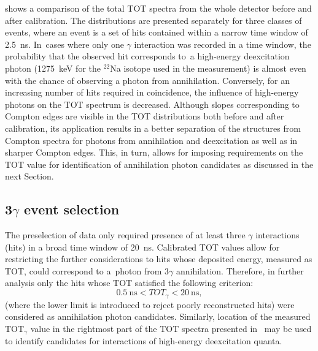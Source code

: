  shows a comparison of the total TOT spectra from the whole detector before and after calibration. The distributions are presented separately for three classes of events, where an event is a set of hits contained within a narrow time window of 2.5~ns. In~cases where only one $\gamma$ interaction was recorded in a time window, the probability that the observed hit corresponds to~a high-energy deexcitation photon (1275~keV for the $^{22}$Na isotope used in the measurement) is almost even with the chance of observing a photon from annihilation. Conversely, for an increasing number of hits required in coincidence, the influence of high-energy photons on the TOT spectrum is decreased. Although slopes corresponding to Compton edges are visible in the TOT distributions both before and after calibration, its application results in a better separation of the structures from Compton spectra for photons from annihilation and deexcitation as well as in sharper Compton edges. This, in turn, allows for imposing requirements on the TOT value for identification of annihilation photon candidates as discussed in the next Section.

\subsection{3$\gamma$ event selection}\label{sec:3g_selection}
The preselection of data only required presence of at least three $\gamma$ interactions (hits) in a broad time window of 20~ns. Calibrated TOT values allow for restricting the further considerations to hits whose deposited energy, measured as TOT, could correspond to a~photon from 3$\gamma$ annihilation. Therefore, in further analysis only the hits whose TOT satisfied the following criterion:
\begin{equation*}
 0.5\ \text{ns} < TOT_{\gamma} < 20\ \text{ns},
\end{equation*}
(where the lower limit is introduced to reject poorly reconstructed hits) were considered as annihilation photon candidates. Similarly, location of the measured TOT$_{\gamma}$ value in the rightmost part of the TOT spectra presented in~ may be used to identify candidates for interactions of high-energy deexcitation quanta.
%
%

